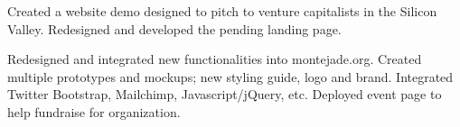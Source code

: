 \documentclass[]{deedy-resume-openfont}
\begin{document}
\begin{minipage}[t]{0.58\textwidth}
\descriptsep 
Created a website demo designed to pitch to venture capitalists in the Silicon Valley. Redesigned and developed the pending landing page.
\sectionsep
\sectionsepextra


\descriptsep 
Redesigned and integrated new functionalities into montejade.org. Created multiple prototypes and mockups; new styling guide, logo and brand. Integrated Twitter Bootstrap, Mailchimp, Javascript/jQuery, etc. Deployed event page to help fundraise for organization.
\sectionsep

\end{minipage} 
\end{document}
